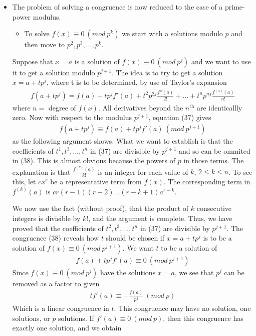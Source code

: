 \documentclass[a4paper]{article}
\begin{document}
\begin{itemize}
    \item The problem of solving a congruence is now reduced to the case of a
    prime-power modulus.
    \begin{itemize}
        \item To solve $f(x)\equiv 0\ (mod\ p^k)$ we start with a solutions modulo
        $p$ and then move to $p^2, p^3,...,p^k$.
    \end{itemize}
    Suppose that $x=a$ is a solution of $f(x)\equiv 0\ (mod\ p^j)$ and we want
    to use it to get a solution modulo $p^{j+1}$.
    The idea is to try to get a solution $x=a+tp^j$, where t is to be determined,
    by use of Taylor's expansion
    \begin{align}
        f(a+tp^j)=f(a)+tp^jf'(a)+t^2p^{2j}\frac{f''(a)}{2!}+...+t^np^{nj}\frac{f^{(n)}(a)}{n!}
    \end{align}
    where $n=$ degree of $f(x)$. All derivatives beyond the $n^\text{th}$ are
    identicallly zero. Now with respect to the modulus $p^{j+1}$, equation (37) gives
    \begin{align*}
        f(a+tp^j)\equiv f(a)+tp^jf'(a)\ (mod\ p^{j+1})
    \end{align*}
    as the following argument shows. What we want to establish is that the
    coefficients of $t^1, t^3,..., t^n$ in (37) are divisible by $p^{j+1}$
    and so can be ommited in (38). This is almost obvious because the powers
    of $p$ in those terms. The explanation is that $\frac{f^{(k)}(a)}{k!}$
    is an integer for each value of $k$, $2\leq k\leq n$. To see this, let
    $cx^r$ be a representative term from $f(x)$. The corresponding term in
    $f^{(k)}(a)$ is $cr(r-1)(r-2)...(r-k+1)a^{r-k}$.


    We now use the fact (without proof), that the product of $k$ consecutive
    integers is divisible by $k!$, and the argument is complete.
    Thus, we have proved that the coefficients of $t^2, t^3,..., t^n$ in (37)
    are divisible by $p^{j+1}$. The congruence (38) reveals how $t$ should be
    chosen if $x=a+tp^j$ is to be a solution of $f(x)\equiv 0\ (mod\ p^{j+1})$.
    We want $t$ to be a solution of
    \begin{align}
        f(a)+tp^jf'(a)\equiv 0\ (mod\ p^{j+1})
    \end{align}
    Since $f(x)\equiv 0\ (mod\ p^j)$ have the solutions $x=a$, we see that $p^j$
    can be removed as a factor to given
    \begin{align}
        tf'(a)\equiv -\frac{f(a)}{p^j}\ (mod\ p)
    \end{align}
    Which is a linear congruence in $t$. This congruence may have no solution,
    one solutions, or $p$ solutions. If $f'(a)\equiv 0\ (mod\ p)$, then this
    congruence has exactly one solution, and we obtain
\end{itemize}
\end{document}
